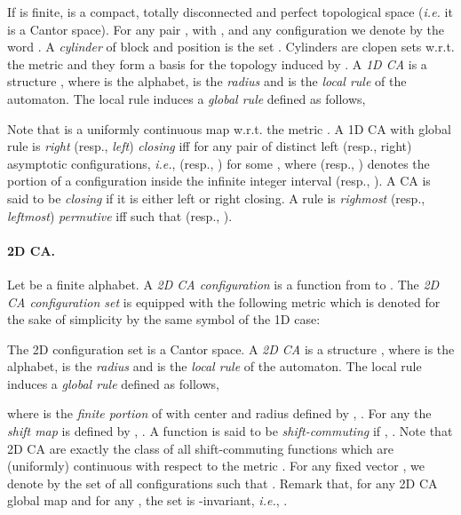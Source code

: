 \documentclass{llncs}
\makeatletter
\newcommand{\ie}{\emph{i.e.}\@\xspace}
\newcommand{\wrt}{w.r.t.\@\xspace}
\newcommand{\ignore}[1]{}
\makeatother
\begin{document}
If  is finite,  is a compact, totally disconnected and
perfect topological space (\ie it is a Cantor space). For any
pair , with , and any configuration 
we denote by  the word .
A \emph{cylinder} of block  and position  is the
set . Cylinders are
clopen sets \wrt the metric  and they form a basis for the
topology induced by .
A \emph{1D CA} is a structure , where
 is the alphabet,  is the \emph{radius} and  is the \emph{local rule} of the automaton. The
local rule  induces a \emph{global rule}  defined
as follows,

Note that  is a uniformly continuous map \wrt the metric .
A 1D CA with global rule  is \emph{right} (resp., \emph{left})
\emph{closing} iff  for any pair
 of distinct left (resp., right) asymptotic
configurations, \ie, 
(resp., ) for some ,
where  (resp., ) denotes the
portion of a configuration  inside the infinite integer
interval  (resp., ). A CA is said to be
\emph{closing} if it is either left or right closing. A rule
 is \emph{righmost} (resp., \emph{leftmost})
\emph{permutive} iff  such that  (resp.,
).
\paragraph{{\bf 2D CA.}} Let  be a finite alphabet. A \emph{2D CA
configuration} is a function from  to . The \emph{2D CA
configuration set}  is equipped with the following metric
which is denoted for the sake of simplicity by the same symbol of
the 1D case:

The 2D configuration set is a Cantor space.
A \emph{2D CA} is a structure , where
 is the alphabet,  is the \emph{radius} and  is the \emph{local rule} of the automaton. The local rule 
induces a \emph{global rule}  defined as follows,

where  is the \emph{finite portion} of 
with center  and radius  defined by , .
For any  the \emph{shift map}
  is defined
by ,
. A function 
is said to be \emph{shift-commuting} if ,
. Note that 2D CA are
exactly the class of all shift-commuting functions which are
(uniformly) continuous with respect to the metric \ignore{(Hedlund's
theorem from~\cite{hedlund69}). A 2D \emph{subshift}  is a
closed subset of the CA configuration space such that for any
, }.
For any fixed vector , we denote by  the set of all
configurations  such that . Remark
that, for any 2D CA global map  and for any , the set
 is -invariant, \ie, .
\end{document}
